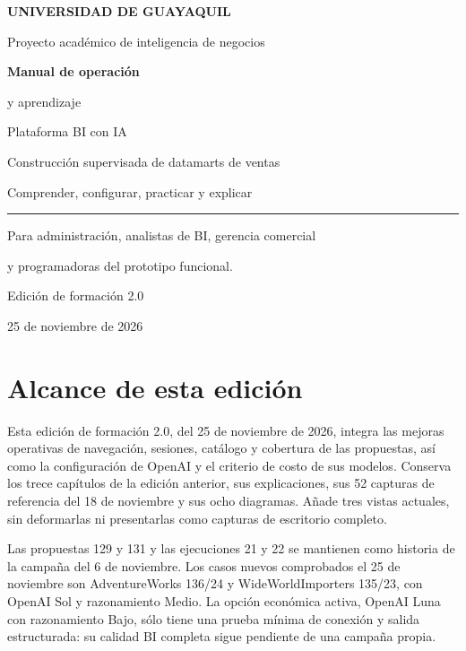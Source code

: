 \documentclass[11pt,a4paper,oneside,openany]{book}
\newcounter{diagramas}
\begin{document}
\begin{titlepage}
\thispagestyle{empty}
{\sffamily\bfseries\color{Teal} UNIVERSIDAD DE GUAYAQUIL\par}
\vspace{0.35cm}
{\sffamily\color{Gris} Proyecto académico de inteligencia de negocios\par}
\vspace{2.0cm}
{\sffamily\bfseries\fontsize{30}{35}\selectfont\color{Azul} Manual de operación\par y aprendizaje\par}
\vspace{0.6cm}
{\sffamily\fontsize{20}{25}\selectfont\color{Teal} Plataforma BI con IA\par}
\vspace{0.8cm}
{\large Construcción supervisada de datamarts de ventas\par}
\vspace{0.5cm}
{\large Comprender, configurar, practicar y explicar\par}
\vspace{1cm}
{\color{Teal}\rule{\textwidth}{1.2pt}\par}
\vspace{0.6cm}
Para administración, analistas de BI, gerencia comercial\par
y programadoras del prototipo funcional.\par
\vfill
{\sffamily\color{Gris} Edición de formación 2.0\par 25 de noviembre de 2026\par}
\end{titlepage}
\frontmatter
\section*{Alcance de esta edición}
Esta edición de formación 2.0, del 25 de noviembre de 2026, integra las mejoras
operativas de navegación, sesiones, catálogo y cobertura de las propuestas,
así como la configuración de OpenAI y el criterio de costo de sus modelos.
Conserva los trece capítulos de la edición anterior, sus explicaciones,
sus 52 capturas de referencia del 18 de noviembre y sus ocho diagramas.
Añade tres vistas actuales, sin deformarlas ni presentarlas como capturas
de escritorio completo.

Las propuestas 129 y 131 y las ejecuciones 21 y 22 se mantienen como historia
de la campaña del 6 de noviembre. Los casos nuevos comprobados el 25 de
noviembre son AdventureWorks 136/24 y WideWorldImporters 135/23, con OpenAI
Sol y razonamiento Medio. La opción económica activa, OpenAI Luna con
razonamiento Bajo, sólo tiene una prueba mínima de conexión y salida
estructurada: su calidad BI completa sigue pendiente de una campaña propia.
\end{document}
